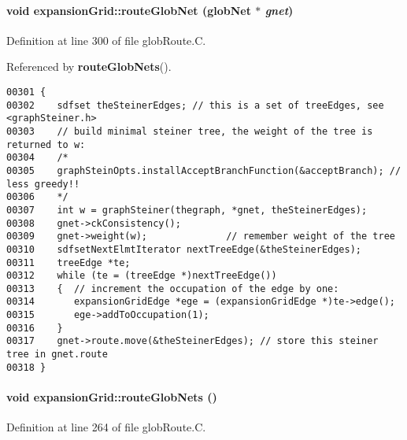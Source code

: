 \paragraph{\setlength{\rightskip}{0pt plus 5cm}void expansion\-Grid::route\-Glob\-Net ({\bf glob\-Net} $\ast$ {\em gnet})}\hfill



Definition at line 300 of file glob\-Route.C.

Referenced by {\bf route\-Glob\-Nets}().\small\begin{verbatim}00301 {
00302    sdfset theSteinerEdges; // this is a set of treeEdges, see <graphSteiner.h>
00303    // build minimal steiner tree, the weight of the tree is returned to w:
00304    /*
00305    graphSteinOpts.installAcceptBranchFunction(&acceptBranch); // less greedy!!
00306    */
00307    int w = graphSteiner(thegraph, *gnet, theSteinerEdges);
00308    gnet->ckConsistency();
00309    gnet->weight(w);              // remember weight of the tree
00310    sdfsetNextElmtIterator nextTreeEdge(&theSteinerEdges);
00311    treeEdge *te;
00312    while (te = (treeEdge *)nextTreeEdge())
00313    {  // increment the occupation of the edge by one:
00314       expansionGridEdge *ege = (expansionGridEdge *)te->edge();
00315       ege->addToOccupation(1);
00316    }
00317    gnet->route.move(&theSteinerEdges); // store this steiner tree in gnet.route
00318 }
\end{verbatim}\normalsize 
\label{expansionGrid_a5}
\paragraph{\setlength{\rightskip}{0pt plus 5cm}void expansion\-Grid::route\-Glob\-Nets ()}\hfill



Definition at line 264 of file glob\-Route.C.


